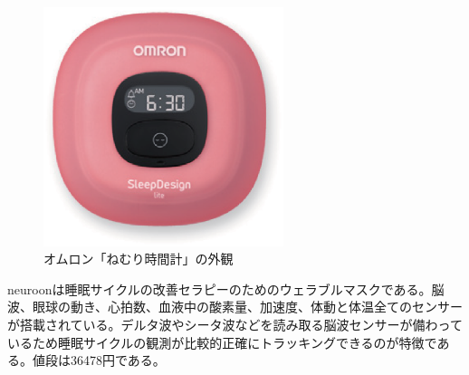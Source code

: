 \begin{figure}[htbp]
\begin{center}
\includegraphics[width=7cm]{eps/omuron.eps}
\caption{オムロン「ねむり時間計」の外観}
\label{omuron}
\end{center}
\end{figure}

neuroonは睡眠サイクルの改善セラピーのためのウェラブルマスクである。脳波、眼球の動き、心拍数、血液中の酸素量、加速度、体動と体温全てのセンサーが搭載されている\cite{neuroon}。デルタ波やシータ波などを読み取る脳波センサーが備わっているため睡眠サイクルの観測が比較的正確にトラッキングできるのが特徴である。値段は36478円である。

